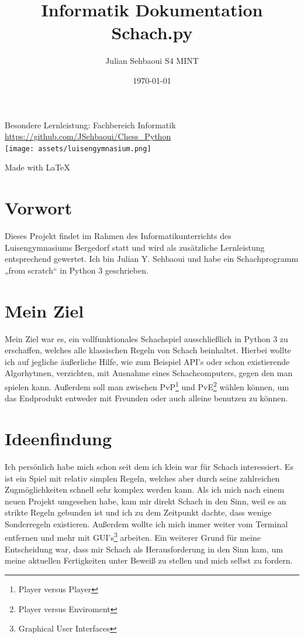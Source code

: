 \documentclass[a4paper, 10pt]{scrartcl}
\title{Informatik Dokumentation \glqq Schach.py\grqq}
\author{Julian Sehbaoui S4 MINT}
\date{\today}
\begin{document}
\begin{titlepage}
        \maketitle
        \centering
        \Large
        Besondere Lernleistung: Fachbereich Informatik
        \normalsize
        \doublespacing
        \url{https://github.com/JSehbaoui/Chess_Python}\\
         \vspace{5pt} 
        \texttt{[image: assets/luisengymnasium.png]}\\
         \vspace{5pt} 
        
        Made with \LaTeX{}
\end{titlepage}

\pagebreak
\tableofcontents
\pagebreak

\section{Vorwort}
Dieses Projekt findet im Rahmen des Informatikunterrichts des Luisengymnasiums 	Bergedorf statt und wird als zusätzliche Lernleistung entsprechend gewertet.
Ich bin Julian Y. Sehbaoui und habe ein Schachprogramm „from scratch“ in Python 3 geschrieben.

\section{Mein Ziel}
Mein Ziel war es, ein vollfunktionales Schachspiel ausschließlich in Python 3
zu erschaffen, welches alle klassischen Regeln von Schach beinhaltet. 
Hierbei wollte ich auf jegliche äußerliche Hilfe, wie zum Beispiel API's oder schon
existierende Algorhytmen, verzichten, mit Ausnahme eines Schachcomputers, gegen den man spielen kann. 
Außerdem soll man zwischen PvP\footnote{Player versus Player} und PvE\footnote{Player versus Enviroment} wählen können,
um das Endprodukt entweder mit Freunden oder auch alleine benutzen zu können.

\section{Ideenfindung}
Ich persönlich habe mich schon seit dem ich klein war für Schach interessiert.
Es ist ein Spiel mit relativ simplen Regeln, welches aber durch seine zahlreichen Zugmöglichkeiten schnell sehr komplex werden kann.
Als ich mich nach einem neuen Projekt umgesehen habe, kam mir direkt Schach in den Sinn, weil es an strikte Regeln gebunden ist und
ich zu dem Zeitpunkt dachte, dass wenige Sonderregeln existieren.
Außerdem wollte ich mich immer weiter vom Terminal entfernen und mehr mit
GUI's\footnote{Graphical User Interfaces} arbeiten. Ein weiterer Grund für meine Entscheidung war,
dass mir Schach als Herausforderung in den Sinn kam, um meine aktuellen Fertigkeiten
unter Beweiß zu stellen und mich selbst zu fordern.
\end{document}
